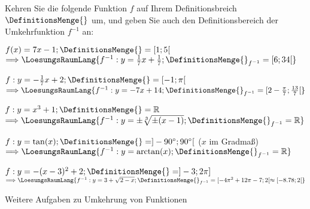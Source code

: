 

\renewcommand{\bbwAufgabenBlockID}{Finv}

\renewcommand{\metaHeaderLine}{Funktionen}
\renewcommand{\arbeitsblattTitel}{Umkehrfunktionen}



\arbeitsblattHeader{}

Kehren Sie die folgende Funktion $f$ auf Ihrem Definitionsbreich
$\DefinitionsMenge{}$ um, und geben Sie auch den Definitionsbereich der
Umkehrfunktion $f^{-1}$ an:


\begin{bbwAufgabenBlock}
\item $f(x) = 7x-1; \DefinitionsMenge{} = [1;5[$
$\Longrightarrow \LoesungsRaumLang{
f^{-1}: y=\frac17 x + \frac17; \DefinitionsMenge{}_{f^{-1}} = [6;34[
}$

\item $f:  y = -\frac17x + 2; \DefinitionsMenge{} = [-1;\pi[$
$\Longrightarrow \LoesungsRaumLang{
f^{-1}: y=-7x+14; \DefinitionsMenge{}_{f^{-1}} = [2-\frac{\pi}{7};\frac{13}{7}[
}$

\item $f:  y = x^3  + 1; \DefinitionsMenge{} = \mathbb{R}$
$\Longrightarrow \LoesungsRaumLang{
f^{-1}: y=\pm\sqrt[3]{\pm(x-1)}; \DefinitionsMenge{}_{f^{-1}} = \mathbb{R}
}$\noTRAINER{\newpage}

\item $f:  y = \tan(x); \DefinitionsMenge{} = ]-90^{\circ};90^{\circ}[$ ($x$ im Gradmaß)
$\Longrightarrow \LoesungsRaumLang{
f^{-1}: y=\arctan(x); \DefinitionsMenge{}_{f^{-1}} = \mathbb{R}
}$

\item $f:  y = -(x-3)^2 + 2; \DefinitionsMenge{} = ]-3;2\pi]$
$\Longrightarrow \LoesungsRaumLang{
f^{-1}: y=3+\sqrt{2-x}; \DefinitionsMenge{}_{f^{-1}} = [-4\pi^2+12\pi-7;2[
\approx{} [-8.78;2[
}$

\end{bbwAufgabenBlock}
\noTRAINER{\newpage}



Weitere Aufgaben zu Umkehrung von Funktionen

